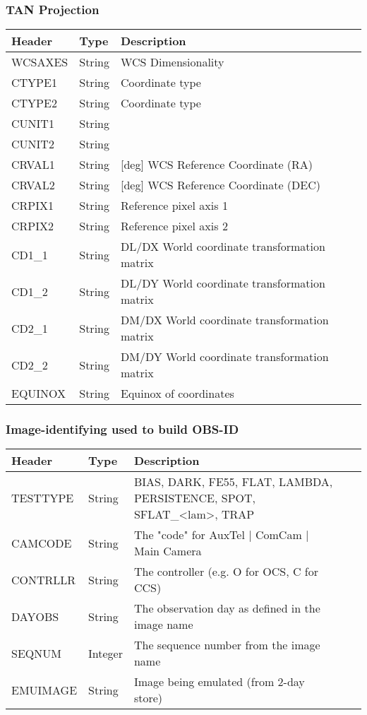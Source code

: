 \subsubsection{TAN Projection}


\begin{tabular}{l l l l l}
\hline
Header & Type & Description \\
\hline
WCSAXES & String & WCS Dimensionality \\
CTYPE1 & String & Coordinate type \\
CTYPE2 & String & Coordinate type \\
CUNIT1 & String &  \\
CUNIT2 & String &  \\
CRVAL1 & String & [deg] WCS Reference Coordinate (RA) \\
CRVAL2 & String & [deg] WCS Reference Coordinate (DEC) \\
CRPIX1 & String & Reference pixel axis 1 \\
CRPIX2 & String & Reference pixel axis 2 \\
CD1\_1 & String & DL/DX World coordinate transformation matrix \\
CD1\_2 & String & DL/DY World coordinate transformation matrix \\
CD2\_1 & String & DM/DX World coordinate transformation matrix \\
CD2\_2 & String & DM/DY World coordinate transformation matrix \\
EQUINOX & String & Equinox of coordinates \\
\hline
\end{tabular}


\subsubsection{Image-identifying used to build OBS-ID}


\begin{tabular}{l l l l l}
\hline
Header & Type & Description \\
\hline
TESTTYPE & String & BIAS, DARK, FE55, FLAT, LAMBDA, PERSISTENCE, SPOT, SFLAT\_<lam>, TRAP \\
CAMCODE & String & The "code" for AuxTel | ComCam | Main Camera \\
CONTRLLR & String & The controller (e.g. O for OCS, C for CCS) \\
DAYOBS & String & The observation day as defined in the image name  \\
SEQNUM & Integer & The sequence number from the image name \\
EMUIMAGE & String & Image being emulated (from 2-day store) \\
\hline
\end{tabular}


